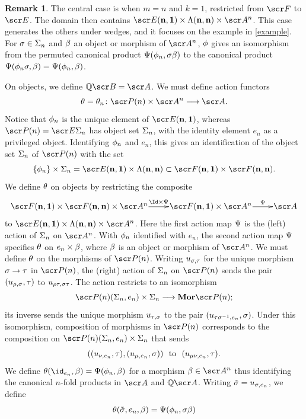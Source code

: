\documentclass{amsart}
\theoremstyle{definition}
\newtheorem{rem}{Remark}[section]
\numberwithin{equation}{section}
\newcommand{\bn}{\mathbf{n}}
\begin{document}
\begin{rem}\label{keyc} The central case is when $m=n$ and $k=1$, restricted from $\sF$ to $\sE$.  The domain then contains
$\sE(\bn,\mathbf{1})\times \LA(\bn,\bn)\times \sA^n$.  This case generates the others under wedges, and it focuses on the example in  \autoref{example}.  For $\sigma\in \Sigma_n$ and $\beta$ an object or morphism of $\sA^n$,  $\phi$ gives an isomorphism from the permuted canonical product $\Psi(\phi_n, \sigma \beta)$ to the canonical product $\Psi(\phi_n\sigma, \beta) = \Psi(\phi_n,\beta)$. 
\end{rem}

On objects, we define $\bQ \sB = \sA$.   We must define action functors 
$$\tha = \tha_n \colon \sP(n) \times \sA^n \rtarr \sA.$$  
Notice that $\phi_n$ is the unique element of  $\sE(\bn,\mathbf{1})$, whereas $\sP(n) = \sE\SI_n$ has object set $\Sigma_n$, with the identity element $e_n$ as a privileged object.  Identifying $\phi_n$ and $e_n$, this gives an 
identification  of the object set $\Sigma_n$ of $\sP(n)$ with the set 
$$\{\ph_n\} \times \SI_n =\sE(\bn,\mathbf{1})\times \LA(\bn,\bn) \subset \sF(\bn,\mathbf{1})\times \sF(\bn,\bn). $$
We define $\theta$ on objects by restricting the composite
$$\xymatrix@1{ \sF(\bn,\mathbf{1}) \times \sF(\bn,\bn) \times \sA^n \ar[r]^-{\Id\times\PS} & \sF(\bn,\mathbf{1})\times \sA^n \ar[r]^-{\PS} &  \sA\\}$$
to $\sE(\bn,\mathbf{1})\times \LA(\bn,\bn)\times \sA^n$.  Here the first action map $\Psi$ is the (left) action of $\Sigma_n$ on $\sA^n$.  With $\phi_n$ identified with $e_n$,  the second action map $\Psi$ specifies $\theta$ on $e_n \times \beta$, where $\beta$ is an object or morphism of $\sA^n$.  We must define $\theta$ on the morphisms of $\sP(n)$.  Writing $u_{\sigma,\tau}$ for the unique morphism 
$\sigma\to \tau$ in $\sP(n)$, the (right) action of $\Sigma_n$ on $\sP(n)$ sends the pair $(u_{\rho,\sigma}, \tau)$ to $u_{\rho \tau, \sigma\tau}$.  The action restricts to an isomorphism
$$ \sP(n)(\SI_n,e_n)\times \SI_n  \rtarr  \mathbf{Mor}\sP(n);$$
its  inverse sends the unique morphism $u_{\tau,\sigma}$ to the pair $(u_{\tau\sigma^{-1},e_n}, \sigma)$. Under this isomorphism, composition of morphisms in $\sP(n)$ corresponds to the composition on $\sP(n)(\SI_n,e_n)\times \SI_n$ that sends  
$$ ((u_{\nu,e_n}, \tau), (u_{\mu,e_n},\sigma))  \ \ \text{to} \ \ (u_{\mu\nu,e_n}, \tau).$$
We define $\tha(\id_{e_n}, \be) = \PS(\ph_n, \be)$ for a morphism $\be\in \sA^n$ thus identifying the canonical $n$-fold products in $\sA$ and $\bQ\sA$.   Writing $\tilde{\sigma} = u_{\sigma,e_n}$, we define 
\begin{equation}\label{keyperm}
\theta(\tilde{\sigma},e_n, \beta) = \Psi(\phi_n,\sigma\beta)
\end{equation}
\end{document}
